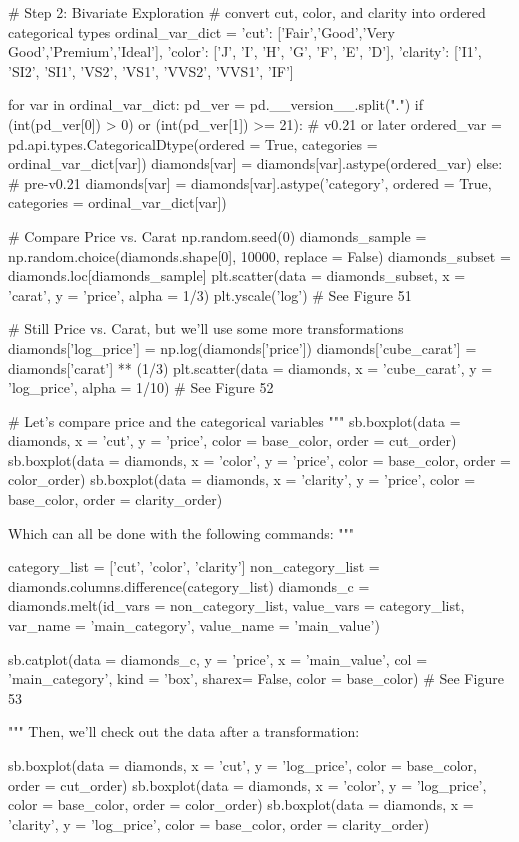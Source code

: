 \begin{python}
	# Step 2: Bivariate Exploration
	# convert cut, color, and clarity into ordered categorical types
	ordinal_var_dict = {'cut': ['Fair','Good','Very Good','Premium','Ideal'],
		'color': ['J', 'I', 'H', 'G', 'F', 'E', 'D'],
		'clarity': ['I1', 'SI2', 'SI1', 'VS2', 'VS1', 'VVS2', 'VVS1', 'IF']}
	
	
	for var in ordinal_var_dict:
		pd_ver = pd.__version__.split(".")
		if (int(pd_ver[0]) > 0) or (int(pd_ver[1]) >= 21): # v0.21 or later
			ordered_var = pd.api.types.CategoricalDtype(ordered = True,
			categories = ordinal_var_dict[var])
			diamonds[var] = diamonds[var].astype(ordered_var)
		else: # pre-v0.21
			diamonds[var] = diamonds[var].astype('category', ordered = True,
			categories = ordinal_var_dict[var])
	
	
	# Compare Price vs. Carat
	np.random.seed(0)
	diamonds_sample = np.random.choice(diamonds.shape[0], 10000, replace = False)
	diamonds_subset = diamonds.loc[diamonds_sample]
	plt.scatter(data = diamonds_subset, x = 'carat', y = 'price', alpha = 1/3)
	plt.yscale('log')
	# See Figure 51
	
	# Still Price vs. Carat, but we'll use some more transformations
	diamonds['log_price'] = np.log(diamonds['price'])
	diamonds['cube_carat'] = diamonds['carat'] ** (1/3)
	plt.scatter(data = diamonds, x = 'cube_carat', y = 'log_price', alpha = 1/10)
	# See Figure 52
	
	# Let's compare price and the categorical variables
	"""
	sb.boxplot(data = diamonds, x = 'cut', y = 'price', color = base_color, order = cut_order)
	sb.boxplot(data = diamonds, x = 'color', y = 'price', color = base_color, order = color_order)
	sb.boxplot(data = diamonds, x = 'clarity', y = 'price', color = base_color, order = clarity_order)
	
	Which can all be done with the following commands:
	"""
	
	category_list = ['cut', 'color', 'clarity']
	non_category_list = diamonds.columns.difference(category_list)
	diamonds_c = diamonds.melt(id_vars = non_category_list, value_vars = category_list, var_name = 'main_category', value_name = 'main_value')

	sb.catplot(data = diamonds_c, y = 'price', x = 'main_value', col = 'main_category', kind = 'box', sharex= False, color = base_color)
	# See Figure 53
	
	"""
	Then, we'll check out the data after a transformation:
	
	sb.boxplot(data = diamonds, x = 'cut', y = 'log_price', color = base_color, order = cut_order)
	sb.boxplot(data = diamonds, x = 'color', y = 'log_price', color = base_color, order = color_order)
	sb.boxplot(data = diamonds, x = 'clarity', y = 'log_price', color = base_color, order = clarity_order)
	

\end{python}
